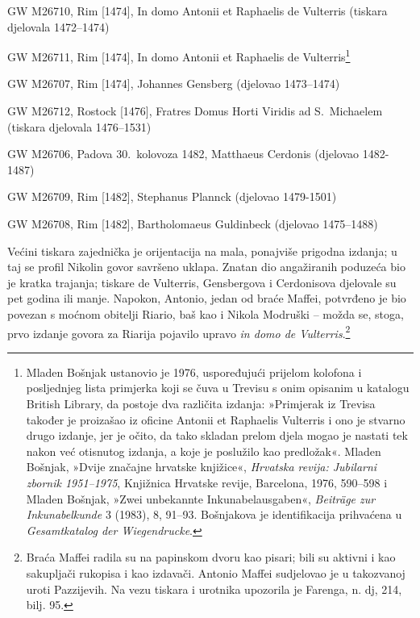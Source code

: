 \documentclass[a5paper,twoside]{article}
\begin{document}
\begin{description}[nolistsep,itemsep=3pt,font=\rmfamily]
\item[V\hphantom{e}] GW M26710, Rim [1474], In domo Antonii et Raphaelis de Vulterris (tiskara djelovala 1472–1474)
\item[V1] GW M26711, Rim [1474], In domo Antonii et Raphaelis de Vulterris\footnote{Mladen Bošnjak ustanovio je 1976, uspoređujući prijelom kolofona i posljednjeg lista primjerka koji se čuva u Trevisu s onim opisanim u katalogu British Library, da postoje dva različita izdanja: »Primjerak iz Trevisa također je proizašao iz oficine Antonii et Raphaelis Vulterris i ono je stvarno drugo izdanje, jer je očito, da tako skladan prelom djela mogao je nastati tek nakon već otisnutog izdanja, a koje je poslužilo kao predložak«. Mladen Bošnjak, »Dvije značajne hrvatske knjižice«, \textit{Hrvatska revija: Jubilarni zbornik 1951–1975}, Knjižnica Hrvatske revije, Barcelona, 1976, 590–598 i Mladen Bošnjak, »Zwei unbekannte Inkunabelausgaben«, \textit{Beiträge zur Inkunabelkunde} 3 (1983), 8, 91–93. Bošnjakova je identifikacija prihvaćena u \textit{Gesamtkatalog der Wiegendrucke}.}
\item[Ge] GW M26707, Rim [1474], Johannes Gensberg (djelovao 1473–1474)
\item[R\hphantom{o}] GW M26712, Rostock [1476], Fratres Domus Horti Viridis ad S.~Michaelem (tiskara djelovala 1476–1531)
\item[C\hphantom{d}] GW M26706, Padova 30.~kolovoza 1482, Matthaeus Cerdonis (djelovao 1482-1487)
\item[P\hphantom{d}] GW M26709, Rim [1482], Stephanus Plannck (djelovao 1479-1501)
\item[Gd] GW M26708, Rim [1482], Bartholomaeus Guldinbeck (djelovao 1475–1488)
\end{description}

Većini tiskara zajednička je orijentacija na mala, ponajviše prigodna izdanja; u taj se profil Nikolin govor savršeno uklapa. Znatan dio angažiranih poduzeća bio je kratka trajanja; tiskare de Vulterris, Gensbergova i Cerdonisova djelovale su pet godina ili manje. Napokon, Antonio, jedan od braće Maffei, potvrđeno je bio povezan s moćnom obitelji Riario, baš kao i Nikola Modruški – možda se, stoga, prvo izdanje govora za Riarija pojavilo upravo \textit{in domo de Vulterris}.\footnote{Braća Maffei radila su na papinskom dvoru kao pisari; bili su aktivni i kao sakupljači rukopisa i kao izdavači. Antonio Maffei sudjelovao je u takozvanoj uroti Pazzijevih. Na vezu tiskara i urotnika upozorila je Farenga, n. dj, 214, bilj. 95.}
\end{document}
